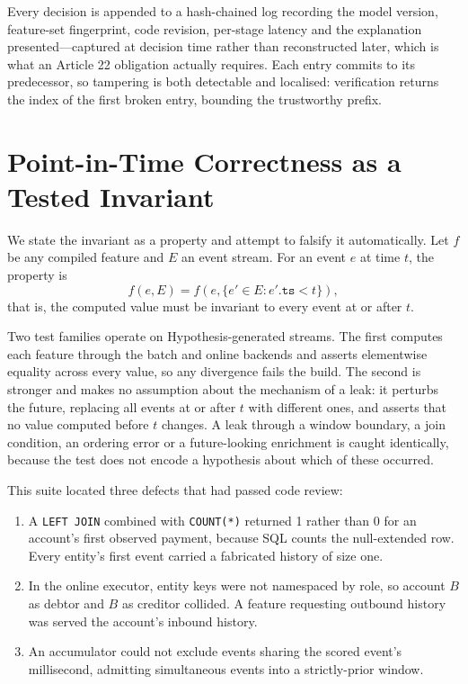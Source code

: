 \documentclass[conference]{IEEEtran}
\begin{document}
Every decision is appended to a hash-chained log recording the model version,
feature-set fingerprint, code revision, per-stage latency and the explanation
presented---captured at decision time rather than reconstructed later, which is
what an Article 22 obligation actually requires. Each entry commits to its
predecessor, so tampering is both detectable and localised: verification returns
the index of the first broken entry, bounding the trustworthy prefix.

\section{Point-in-Time Correctness as a Tested Invariant}
\label{sec:pit}

We state the invariant as a property and attempt to falsify it automatically.
Let $f$ be any compiled feature and $E$ an event stream. For an event $e$ at
time $t$, the property is
\[
f(e, E) = f(e, \{e' \in E : e'.\texttt{ts} < t\}),
\]
that is, the computed value must be invariant to every event at or after $t$.

Two test families operate on Hypothesis-generated streams. The first computes
each feature through the batch and online backends and asserts elementwise
equality across every value, so any divergence fails the build. The second is
stronger and makes no assumption about the mechanism of a leak: it perturbs the
future, replacing all events at or after $t$ with different ones, and asserts
that no value computed before $t$ changes. A leak through a window boundary, a
join condition, an ordering error or a future-looking enrichment is caught
identically, because the test does not encode a hypothesis about which of these
occurred.

This suite located three defects that had passed code review:

\begin{enumerate}
\item A \texttt{LEFT JOIN} combined with \texttt{COUNT(*)} returned 1 rather
      than 0 for an account's first observed payment, because SQL counts the
      null-extended row. Every entity's first event carried a fabricated
      history of size one.
\item In the online executor, entity keys were not namespaced by role, so
      account $B$ as debtor and $B$ as creditor collided. A feature requesting
      outbound history was served the account's inbound history.
\item An accumulator could not exclude events sharing the scored event's
      millisecond, admitting simultaneous events into a strictly-prior window.
\end{enumerate}
\end{document}
